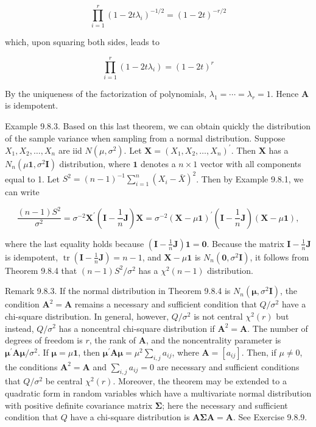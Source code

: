 $$
\prod_{i=1}^{r}\left(1-2 t \lambda_{i}\right)^{-1 / 2}=(1-2 t)^{-r / 2}
$$

which, upon squaring both sides, leads to

$$
\prod_{i=1}^{r}\left(1-2 t \lambda_{i}\right)=(1-2 t)^{r}
$$

By the uniqueness of the factorization of polynomials, $\lambda_{1}=\cdots=\lambda_{r}=1$. Hence $\mathbf{A}$ is idempotent.

Example 9.8.3. Based on this last theorem, we can obtain quickly the distribution of the sample variance when sampling from a normal distribution. Suppose $X_{1}, X_{2}, \ldots, X_{n}$ are iid $N\left(\mu, \sigma^{2}\right)$. Let $\mathbf{X}=\left(X_{1}, X_{2}, \ldots, X_{n}\right)^{\prime}$. Then $\mathbf{X}$ has a $N_{n}\left(\mu \mathbf{1}, \sigma^{2} \mathbf{I}\right)$ distribution, where $\mathbf{1}$ denotes a $n \times 1$ vector with all components equal to 1. Let $S^{2}=(n-1)^{-1} \sum_{i=1}^{n}\left(X_{i}-\bar{X}\right)^{2}$. Then by Example 9.8.1, we can write

$$
\frac{(n-1) S^{2}}{\sigma^{2}}=\sigma^{-2} \mathbf{X}^{\prime}\left(\mathbf{I}-\frac{1}{n} \mathbf{J}\right) \mathbf{X}=\sigma^{-2}(\mathbf{X}-\mu \mathbf{1})^{\prime}\left(\mathbf{I}-\frac{1}{n} \mathbf{J}\right)(\mathbf{X}-\mu \mathbf{1}),
$$

where the last equality holds because $\left(\mathbf{I}-\frac{1}{n} \mathbf{J}\right) \mathbf{1}=\mathbf{0}$. Because the matrix $\mathbf{I}-\frac{1}{n} \mathbf{J}$ is idempotent, $\operatorname{tr}\left(\mathbf{I}-\frac{1}{n} \mathbf{J}\right)=n-1$, and $\mathbf{X}-\mu \mathbf{1}$ is $N_{n}\left(\mathbf{0}, \sigma^{2} \mathbf{I}\right)$, it follows from Theorem 9.8.4 that $(n-1) S^{2} / \sigma^{2}$ has a $\chi^{2}(n-1)$ distribution.

Remark 9.8.3. If the normal distribution in Theorem 9.8.4 is $N_{n}\left(\boldsymbol{\mu}, \sigma^{2} \mathbf{I}\right)$, the condition $\mathbf{A}^{2}=\mathbf{A}$ remains a necessary and sufficient condition that $Q / \sigma^{2}$ have a chi-square distribution. In general, however, $Q / \sigma^{2}$ is not central $\chi^{2}(r)$ but instead, $Q / \sigma^{2}$ has a noncentral chi-square distribution if $\mathbf{A}^{2}=\mathbf{A}$. The number of degrees of freedom is $r$, the rank of $\mathbf{A}$, and the noncentrality parameter is $\boldsymbol{\mu}^{\prime} \mathbf{A} \boldsymbol{\mu} / \sigma^{2}$. If $\boldsymbol{\mu}=\mu \mathbf{1}$, then $\boldsymbol{\mu}^{\prime} \mathbf{A} \boldsymbol{\mu}=\mu^{2} \sum_{i, j} a_{i j}$, where $\mathbf{A}=\left[a_{i j}\right]$. Then, if $\mu \neq 0$, the conditions $\mathbf{A}^{2}=\mathbf{A}$ and $\sum_{i, j} a_{i j}=0$ are necessary and sufficient conditions that $Q / \sigma^{2}$ be central $\chi^{2}(r)$. Moreover, the theorem may be extended to a quadratic form in random variables which have a multivariate normal distribution with positive definite covariance matrix $\boldsymbol{\Sigma}$; here the necessary and sufficient condition that $Q$ have a chi-square distribution is $\mathbf{A} \boldsymbol{\Sigma} \mathbf{A}=\mathbf{A}$. See Exercise 9.8.9.

